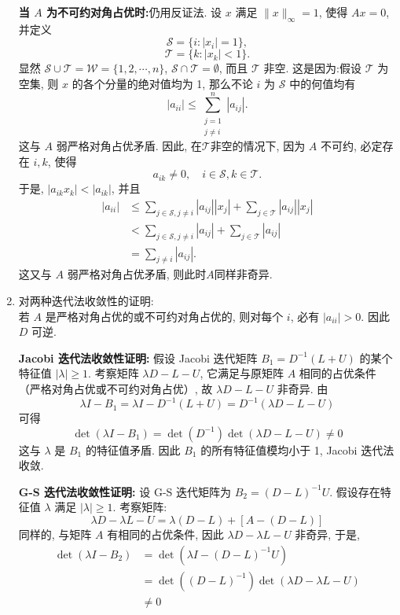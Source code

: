 \documentclass[12pt, answers]{exam}     %
\begin{document}
\begin{questions}
\begin{solution}
\begin{enumerate}
    \noindent\textbf{当 $ A $ 为不可约对角占优时:}仍用反证法. 设 \( x \) 满足 \(\|x\|_{\infty} = 1\), 使得 \( Ax = 0 \), 并定义
    \[
    \mathcal{S} = \{i: |x_i| = 1\}, 
    \]
    \[
    \mathcal{T} = \{k: |x_k| < 1\}. 
    \]
    显然 \( \mathcal{S} \cup \mathcal{T} = \mathcal{W} = \{1, 2, \cdots, n\} \), \( \mathcal{S} \cap \mathcal{T} = \emptyset \), 而且 \( \mathcal{T} \) 非空. 这是因为:假设 \( \mathcal{T} \) 为空集, 则 \( x \) 的各个分量的绝对值均为 1, 那么不论 \( i \) 为 \( \mathcal{S} \) 中的何值均有
    \[
    |a_{ii}| \leq \sum_{\substack{j=1 \\ j \neq i}}^{n} |a_{ij}|. 
    \]
    这与 \( A \) 弱严格对角占优矛盾. 因此, 在\(\mathcal{T}\)非空的情况下, 因为 \( A \) 不可约, 必定存在 \( i, k \), 使得
    \[
    a_{ik} \neq 0, \quad i \in \mathcal{S}, k \in \mathcal{T}. 
    \]
    于是, \( |a_{ik}x_k| < |a_{ik}| \), 并且
    \begin{align*}
    |a_{ii}| &\leq \sum_{j \in \mathcal{S}, j \neq i} |a_{ij}| |x_j| + \sum_{j \in \mathcal{T}} |a_{ij}| |x_j|  \\
    &< \sum_{j \in \mathcal{S}, j \neq i} |a_{ij}| + \sum_{j \in \mathcal{T}} |a_{ij}|  \\ 
    &= \sum_{j \neq i} |a_{ij}|. 
    \end{align*}
    这又与 \( A \) 弱严格对角占优矛盾, 则此时\( A \)同样非奇异. 
    \item
    对两种迭代法收敛性的证明:   \\
    若 \( A \) 是严格对角占优的或不可约对角占优的, 则对每个 \( i \), 必有 \( |a_{ii}| > 0 \). 因此 \( D \) 可逆. 

    \noindent\textbf{Jacobi 迭代法收敛性证明:}
    假设 Jacobi 迭代矩阵 \( B_1 = D^{-1}(L+U) \) 的某个特征值 \( |\lambda| \geq 1 \). 考察矩阵 \( \lambda D - L - U \), 它满足与原矩阵 \( A \) 相同的占优条件（严格对角占优或不可约对角占优）, 故 \( \lambda D - L - U \) 非奇异. 由
    \[
    \lambda I - B_1 = \lambda I - D^{-1}(L + U) = D^{-1}(\lambda D - L - U)
    \]
    可得
    \[
    \det(\lambda I - B_1) = \det(D^{-1}) \det(\lambda D - L - U) \neq 0
    \]
    这与 \( \lambda \) 是 \( B_1 \) 的特征值矛盾. 因此 \( B_1 \) 的所有特征值模均小于 1, Jacobi 迭代法收敛. 

    \noindent\textbf{G-S 迭代法收敛性证明:}
    设 G-S 迭代矩阵为 \( B_2 = (D - L)^{-1}U \). 假设存在特征值 \( \lambda \) 满足 \( |\lambda| \geq 1 \). 考察矩阵:
    \[
    \lambda D - \lambda L - U = \lambda (D - L) + [A - (D - L)]
    \]
    同样的, 与矩阵 \( A \) 有相同的占优条件, 因此 \( \lambda D - \lambda L - U \) 非奇异, 
    于是, 
    \begin{align*}
    \det(\lambda I - B_2) &= \det\left( \lambda I - (D - L)^{-1}U \right)  \\
    &=\det ( (D - L)^{-1} ) \det ( \lambda D - \lambda L - U)  \\ &\ne 0
    \end{align*}


\end{enumerate}
\end{solution}
\end{questions}
\end{document}
